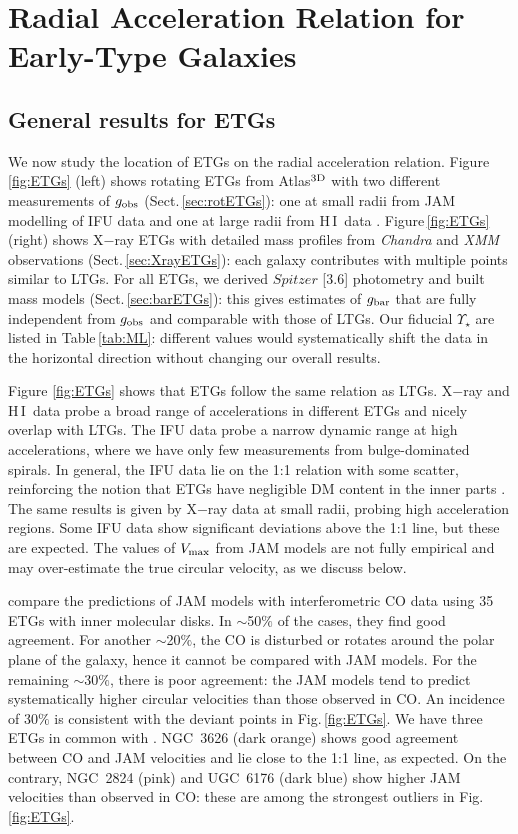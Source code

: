 \documentclass[apjl, twocolappendix]{emulateapj}
\newcommand{\hi } {{\rm H}\,{\small\rm I} \,}
\begin{document}
\section{Radial Acceleration Relation for Early-Type Galaxies}\label{sec:ETGs}

\subsection{General results for ETGs}

We now study the location of ETGs on the radial acceleration relation. Figure\,\ref{fig:ETGs} (left) shows rotating ETGs from Atlas$^{\rm 3D}$ with two different measurements of $g_{\rm obs}$ (Sect.\,\ref{sec:rotETGs}): one at small radii from JAM modelling of IFU data \citep{Cappellari2013} and one at large radii from \hi data \citep{denHeijer2015}. Figure\,\ref{fig:ETGs} (right) shows X$-$ray ETGs with detailed mass profiles from \emph{Chandra} and \emph{XMM} observations (Sect.\,\ref{sec:XrayETGs}): each galaxy contributes with multiple points similar to LTGs. For all ETGs, we derived $Spitzer$ [3.6] photometry and built mass models (Sect.\,\ref{sec:barETGs}): this gives estimates of $g_{\rm bar}$ that are fully independent from $g_{\rm obs}$ and comparable with those of LTGs. Our fiducial $\Upsilon_{\star}$ are listed in Table\,\ref{tab:ML}: different values would systematically shift the data in the horizontal direction without changing our overall results.

Figure \ref{fig:ETGs} shows that ETGs follow the same relation as LTGs. X$-$ray and \hi data probe a broad range of accelerations in different ETGs and nicely overlap with LTGs. The IFU data probe a narrow dynamic range at high accelerations, where we have only few measurements from bulge-dominated spirals. In general, the IFU data lie on the 1:1 relation with some scatter, reinforcing the notion that ETGs have negligible DM content in the inner parts \citep{Cappellari2016}. The same results is given by X$-$ray data at small radii, probing high acceleration regions. Some IFU data show significant deviations above the 1:1 line, but these are expected. The values of $V_{\rm max}$ from JAM models are not fully empirical and may over-estimate the true circular velocity, as we discuss below.

\citet{Davis2013} compare the predictions of JAM models with interferometric CO data using 35 ETGs with inner molecular disks. In $\sim$50$\%$ of the cases, they find good agreement. For another $\sim$20$\%$, the CO is disturbed or rotates around the polar plane of the galaxy, hence it cannot be compared with JAM models. For the remaining $\sim$30$\%$, there is poor agreement: the JAM models tend to predict systematically higher circular velocities than those observed in CO. An incidence of 30$\%$ is consistent with the deviant points in Fig.\,\ref{fig:ETGs}. We have three ETGs in common with \citet{Davis2013}. NGC~3626 (dark orange) shows good agreement between CO and JAM velocities and lie close to the 1:1 line, as expected. On the contrary, NGC~2824 (pink) and UGC~6176 (dark blue) show higher JAM velocities than observed in CO: these are among the strongest outliers in Fig.\,\ref{fig:ETGs}.
\end{document}
